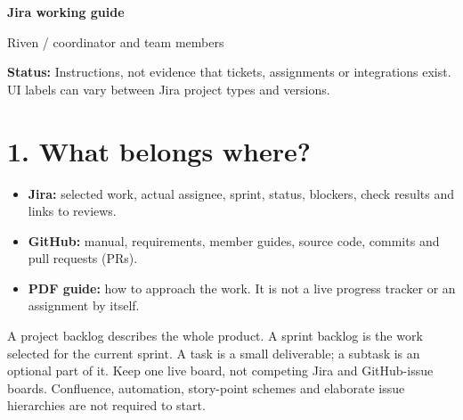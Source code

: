 

{\LARGE\bfseries\textcolor{riven}{Jira working guide}}\par
{\large Riven / coordinator and team members}\par
\textbf{Status:} Instructions, not evidence that tickets, assignments or integrations exist. UI labels can vary between Jira project types and versions.

\section*{1. What belongs where?}
\begin{itemize}
\item \textbf{Jira:} selected work, actual assignee, sprint, status, blockers, check results and links to reviews.
\item \textbf{GitHub:} manual, requirements, member guides, source code, commits and pull requests (PRs).
\item \textbf{PDF guide:} how to approach the work. It is not a live progress tracker or an assignment by itself.
\end{itemize}
A project backlog describes the whole product. A sprint backlog is the work selected for the current sprint. A task is a small deliverable; a subtask is an optional part of it. Keep one live board, not competing Jira and GitHub-issue boards. Confluence, automation, story-point schemes and elaborate issue hierarchies are not required to start.

